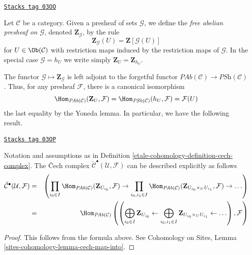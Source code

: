 \begin{definition}
\label{etale-cohomology-definition-free-abelian-presheaf}
\href{https://stacks.math.columbia.edu/tag/03OO}{\texttt{Stacks tag 03OO}}

Let $\mathcal{C}$ be a category.
Given a presheaf of sets $\mathcal{G}$, we define the
{\it free abelian presheaf on $\mathcal{G}$},
denoted $\mathbf{Z}_\mathcal{G}$, by the rule
$$
\mathbf{Z}_\mathcal{G}(U)
=
\mathbf{Z}[\mathcal{G}(U)]
$$
for $U \in \Ob(\mathcal{C})$
with restriction maps induced by the restriction maps of $\mathcal{G}$.
In the special case $\mathcal{G} = h_U$ we write simply
$\mathbf{Z}_U = \mathbf{Z}_{h_U}$.
\end{definition}

The functor $\mathcal{G} \mapsto \mathbf{Z}_\mathcal{G}$ is left adjoint to the
forgetful functor $\textit{PAb}(\mathcal{C}) \to \textit{PSh}(\mathcal{C})$.
Thus, for any presheaf $\mathcal{F}$, there is a canonical isomorphism
$$
\Hom_{\textit{PAb}(\mathcal{C})}(\mathbf{Z}_U, \mathcal{F})
=
\Hom_{\textit{PSh}(\mathcal{C})}(h_U, \mathcal{F})
=
\mathcal{F}(U)
$$
the last equality by the Yoneda lemma. In particular, we have the following
result.

\begin{lemma}
\label{etale-cohomology-lemma-cech-complex-describe}
\href{https://stacks.math.columbia.edu/tag/03OP}{\texttt{Stacks tag 03OP}}

Notation and assumptions as in Definition \ref{etale-cohomology-definition-cech-complex}.
The {\v C}ech complex $\check{\mathcal{C}}^\bullet(\mathcal{U}, \mathcal{F})$
can be described explicitly as follows
\begin{eqnarray*}
\check{\mathcal{C}}^\bullet(\mathcal{U}, \mathcal{F})
& = &
\left(
\prod_{i_0 \in I}
\Hom_{\textit{PAb}(\mathcal{C})}(\mathbf{Z}_{U_{i_0}}, \mathcal{F}) \to
\prod_{i_0, i_1 \in I}
\Hom_{\textit{PAb}(\mathcal{C})}(
\mathbf{Z}_{U_{i_0} \times_U U_{i_1}}, \mathcal{F}) \to \ldots
\right) \\
& = &
\Hom_{\textit{PAb}(\mathcal{C})}\left(
\left(
\bigoplus_{i_0 \in I} \mathbf{Z}_{U_{i_0}} \leftarrow
\bigoplus_{i_0, i_1 \in I} \mathbf{Z}_{U_{i_0} \times_U U_{i_1}} \leftarrow
\ldots
\right), \mathcal{F}\right)
\end{eqnarray*}
\end{lemma}

\begin{proof}
This follows from the formula above. See
Cohomology on Sites, Lemma \ref{sites-cohomology-lemma-cech-map-into}.
\end{proof}

